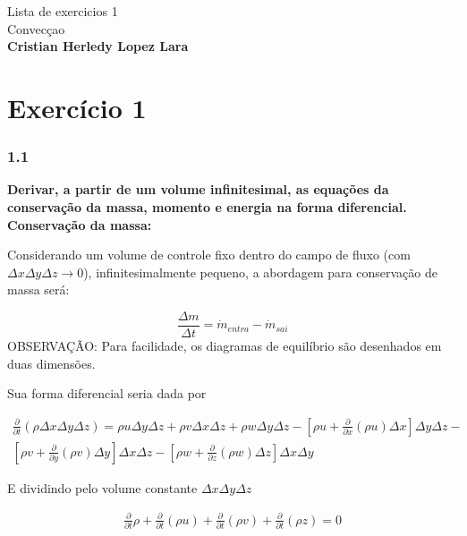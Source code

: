 \documentclass[]{article}
\title{}
\author{}
\begin{document}
\begin{center}
	{\tiny {\normalsize {\large Lista de exercicios 1\\
Convecçao\\
\textbf{Cristian Herledy Lopez Lara}}}}
\end{center}

\section*{Exercício 1}
\subsubsection*{1.1}

\textbf{Derivar, a partir de um volume infinitesimal, as equações da conservação da massa, momento e energia na forma diferencial.} \\


\textbf{Conservação da massa:} 

Considerando um volume de controle fixo dentro do campo de fluxo (com $\Delta x \Delta y  \Delta z \rightarrow 0 $), infinitesimalmente pequeno, a abordagem para conservação de massa será:

\begin{equation}
	\frac{\Delta m}{\Delta t} = \dot{m}_{entra} - \dot{m}_{sai}
\end{equation}
OBSERVAÇÃO: Para facilidade, os diagramas de equilíbrio são desenhados em duas dimensões.




Sua forma diferencial seria dada por

\begin{equation}
	\begin{aligned}
		\frac{\partial}{\partial t} (\rho \Delta x \Delta y \Delta z) = \rho u\Delta y\Delta z + \rho v\Delta x\Delta z + \rho w\Delta y\Delta z - [\rho u +	\frac{\partial}{\partial x}(\rho u)\Delta x]\Delta y\Delta z - \\ [\rho v +	\frac{\partial}{\partial y}(\rho v)\Delta y]\Delta x\Delta z - [\rho w +	\frac{\partial}{\partial z}(\rho w)\Delta z]\Delta x\Delta y
	\end{aligned}
\end{equation}

E dividindo pelo volume constante $\Delta x \Delta y  \Delta z$

\begin{equation}
	\begin{aligned}
		\frac{\partial}{\partial t} \rho + \frac{\partial}{\partial t} (\rho u) + \frac{\partial}{\partial t} (\rho v) + \frac{\partial}{\partial t} (\rho z) = 0 
	\end{aligned}
\end{equation}
\end{document}
